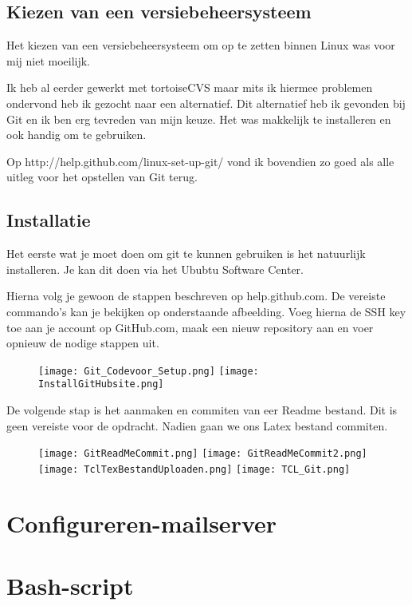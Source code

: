 \documentclass{article}
\begin{document}
\begin{flushleft}
\subsection{Kiezen van een versiebeheersysteem}
Het kiezen van een versiebeheersysteem om op te zetten binnen Linux was voor mij niet moeilijk.\medskip

Ik heb al eerder gewerkt met tortoiseCVS maar mits ik hiermee problemen ondervond heb ik gezocht naar een alternatief. Dit alternatief heb ik gevonden bij Git en ik ben erg tevreden van mijn keuze. Het was makkelijk te installeren en ook handig om te gebruiken.\medskip

Op http://help.github.com/linux-set-up-git/ vond ik bovendien zo goed als alle uitleg voor het opstellen van Git terug.
\subsection{Installatie}
Het eerste wat je moet doen om git te kunnen gebruiken is het natuurlijk installeren. Je kan dit doen via het Ububtu Software Center.\medskip

Hierna volg je gewoon de stappen beschreven op help.github.com. De vereiste commando's kan je bekijken op onderstaande afbeelding. Voeg hierna de SSH key toe aan je account op GitHub.com, maak een nieuw repository aan en voer opnieuw de nodige stappen uit.\medskip

\begin{figure}[htp]
\texttt{[image: Git\_Codevoor\_Setup.png]}
\label{}
\texttt{[image: InstallGitHubsite.png]}
\label{}
\end{figure}
\newpage
De volgende stap is het aanmaken en commiten van eer Readme bestand. Dit is geen vereiste voor de opdracht. Nadien gaan we ons Latex bestand commiten.
\begin{figure}[htp]
\texttt{[image: GitReadMeCommit.png]}
\texttt{[image: GitReadMeCommit2.png]}
\label{}
\texttt{[image: TclTexBestandUploaden.png]}
\label{}
\texttt{[image: TCL\_Git.png]}
\end{figure}
\newpage
\section[Mail-server]{Configureren-mailserver}
\section{Bash-script}
\end{flushleft}
\end{document}
